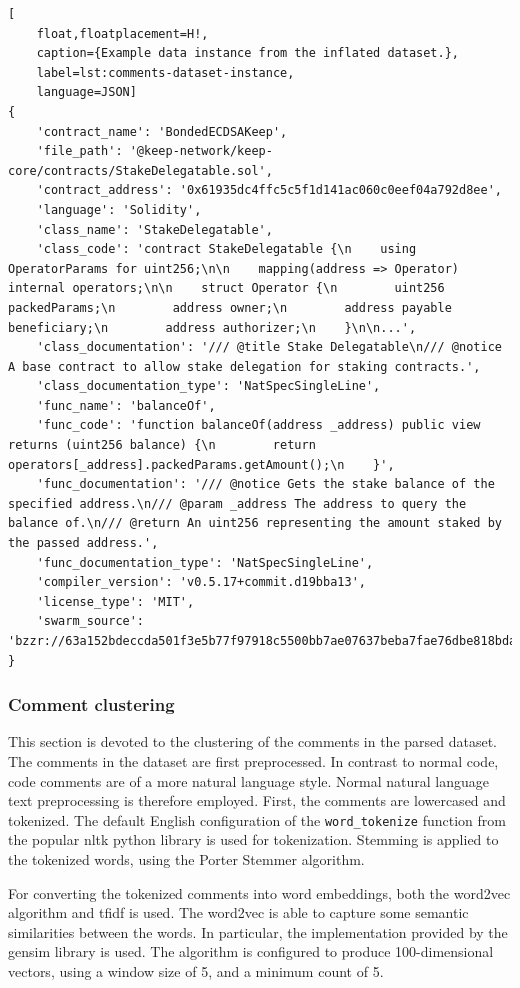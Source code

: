 \begin{lstlisting}[
    float,floatplacement=H!,
    caption={Example data instance from the inflated dataset.},
    label=lst:comments-dataset-instance,
    language=JSON]
{
    'contract_name': 'BondedECDSAKeep',
    'file_path': '@keep-network/keep-core/contracts/StakeDelegatable.sol',
    'contract_address': '0x61935dc4ffc5c5f1d141ac060c0eef04a792d8ee',
    'language': 'Solidity',
    'class_name': 'StakeDelegatable',
    'class_code': 'contract StakeDelegatable {\n    using OperatorParams for uint256;\n\n    mapping(address => Operator) internal operators;\n\n    struct Operator {\n        uint256 packedParams;\n        address owner;\n        address payable beneficiary;\n        address authorizer;\n    }\n\n...',
    'class_documentation': '/// @title Stake Delegatable\n/// @notice A base contract to allow stake delegation for staking contracts.',
    'class_documentation_type': 'NatSpecSingleLine',
    'func_name': 'balanceOf',
    'func_code': 'function balanceOf(address _address) public view returns (uint256 balance) {\n        return operators[_address].packedParams.getAmount();\n    }',
    'func_documentation': '/// @notice Gets the stake balance of the specified address.\n/// @param _address The address to query the balance of.\n/// @return An uint256 representing the amount staked by the passed address.',
    'func_documentation_type': 'NatSpecSingleLine',
    'compiler_version': 'v0.5.17+commit.d19bba13',
    'license_type': 'MIT',
    'swarm_source': 'bzzr://63a152bdeccda501f3e5b77f97918c5500bb7ae07637beba7fae76dbe818bda4'
}  
\end{lstlisting}

\subsubsection{Comment clustering}
\label{sec:comment-clustering}
This section is devoted to the clustering of the comments in the parsed dataset. The comments in the dataset are first preprocessed. In contrast to normal code, code comments are of a more natural language style. Normal natural language text preprocessing is therefore employed. First, the comments are lowercased and tokenized. The default English configuration of the \lstinline[language=Python]!word_tokenize! function from the popular \acrfull{nltk} \cite{nltk} python library is used for tokenization. Stemming is applied to the tokenized words, using the Porter Stemmer algorithm.

For converting the tokenized comments into word embeddings, both the word2vec algorithm \cite{word2vec} and \acrfull{tfidf} is used. The word2vec is able to capture some semantic similarities between the words. In particular, the implementation provided by the gensim library \cite{gensim} is used. The algorithm is configured to produce 100-dimensional vectors, using a window size of 5, and a minimum count of 5. 

